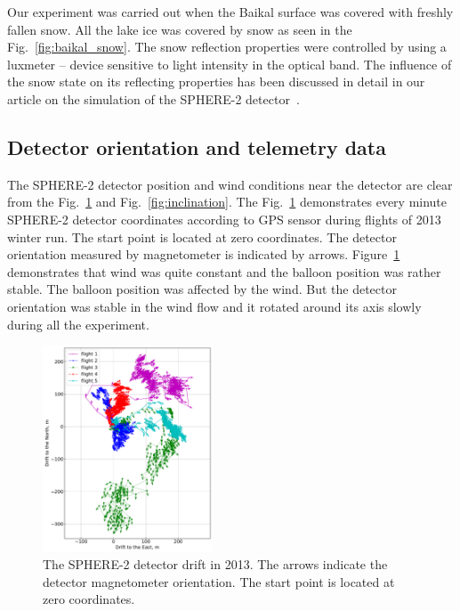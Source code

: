 \documentclass[final,5p,times,twocolumn]{elsarticle}
\begin{document}
Our experiment was carried out when the Baikal surface was covered with freshly fallen snow. All the lake ice was covered by snow as seen in the Fig.~\ref{fig:baikal_snow}.  The snow reflection properties were controlled by using a luxmeter -- device sensitive to light intensity in the optical band. The influence of the snow state on its reflecting properties has been discussed in detail in our article on the simulation of the SPHERE-2 detector~\cite{Ant19}. 


\subsection{Detector orientation and telemetry data\label{sect:telemetrydata}}

The \mbox{SPHERE-2} detector position and wind conditions near the detector are clear from the Fig.~\ref{fig:gps_compass} and Fig.~\ref{fig:inclination}. The Fig.~\ref{fig:gps_compass} demonstrates every minute \mbox{SPHERE-2} detector coordinates according to GPS sensor during flights of 2013 winter run. The start point is located at zero coordinates. The detector orientation measured by magnetometer is indicated by arrows. Figure~\ref{fig:gps_compass} demonstrates that wind was quite constant and the balloon position was rather stable. The balloon position was affected by the wind. But the detector orientation was stable in the wind flow and it rotated around its axis slowly during all the experiment.  

\begin{figure}[tb]
    \includegraphics[width=0.45\textwidth]{figs/GPS+quiver.pdf}\hspace{2pc}%
    \caption{The SPHERE-2 detector drift in 2013. The arrows indicate the detector magnetometer orientation. The start point is located at zero coordinates.}
\label{fig:gps_compass}
\end{figure}
\end{document}

